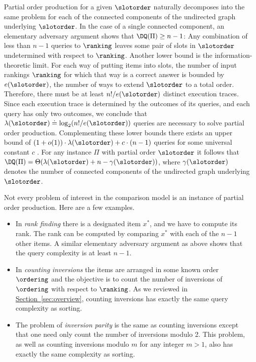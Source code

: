 \documentclass[11pt]{article}
\numberwithin{equation}{section}
\theoremstyle{definition}
\theoremstyle{plain}
\newcommand{\expref}[2]{\hyperref[#2]{#1~\ref{#2}}}
\begin{document}
Partial order production for a given $\slotorder$ naturally decomposes into the same problem for each of the connected components of the undirected graph underlying $\slotorder$. In the case of a single connected component, an elementary adversary argument shows that $\DQ(\Pi) \ge n-1$: Any combination of less than $n-1$ queries to $\ranking$ leaves some pair of slots in $\slotorder$ undetermined with respect to $\ranking$. Another lower bound is the information-theoretic limit. For each way of putting items into slots, the number of input rankings $\ranking$ for which that way is a correct answer is bounded by $e(\slotorder)$, the number of ways to extend $\slotorder$ to a total order. Therefore, there must be at least $n!/e(\slotorder)$ distinct execution traces. Since each execution trace is determined by the outcomes of its queries, and each query has only two outcomes, we conclude that $\lambda(\slotorder) \doteq \log_2(n!/e(\slotorder))$ queries are necessary to solve partial order production. Complementing these lower bounds there exists an upper bound of $(1 + o(1))\cdot \lambda(\slotorder) + c \cdot (n-1)$ queries for some universal constant $c$ \cite{CFJJM2008}. For any
%
instance $\Pi$ with partial order $\slotorder$ it follows that $\DQ(\Pi)= \Theta(\lambda(\slotorder) + n - \gamma(\slotorder))$, where $\gamma(\slotorder)$ denotes the number of connected components of the undirected graph underlying $\slotorder$. 

Not every problem of interest in the comparison model is an instance of partial order production. Here are a few examples.
\begin{itemize}
\item In \emph{rank finding} there is a designated item $x^*$, and we have to compute its rank. The rank can be computed by comparing $x^*$ with each of the $n-1$ other items. A similar elementary adversary argument as above shows that the query complexity is at least $n-1$.
\item In \emph{counting inversions} the items are arranged in some known order $\ordering$ and the objective is to count the number of inversions of $\ordering$ with respect to $\ranking$. As we reviewed in \expref{Section}{sec:overview}, counting inversions has exactly the same query complexity as sorting.
\item The problem of \emph{inversion parity} is the same as counting inversions except that one need only count the number of inversions modulo 2. This problem, as well as counting inversions modulo $m$ for any integer $m > 1$, also has exactly the same complexity as sorting.
\end{itemize}
\end{document}
